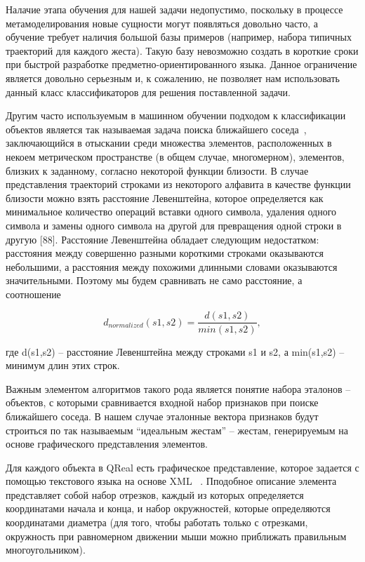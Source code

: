 \documentclass[a5paper]{article}
\begin{document}
Налачие этапа обучения для нашей задачи недопустимо, поскольку в процессе метамоделирования новые сущности могут появляться
довольно часто, а обучение требует наличия большой базы примеров (например, набора типичных траекторий для каждого жеста). Такую
базу невозможно создать в короткие сроки при быстрой разработке предметно-ориентированного языка. 
Данное ограничение является довольно серьезным и, к сожалению, не позволяет нам использовать данный класс классификаторов для решения 
поставленной задачи.

Другим часто используемым в машинном обучении подходом к классификации объектов является так называемая задача поиска ближайшего 
соседа~\cite{nns1, nns2}, заключающийся в отыскании среди множества элементов, расположенных в некоем метрическом пространстве (в 
общем случае, многомерном), элементов, близких к заданному, согласно некоторой функции близости. 
В случае представления траекторий строками из некоторого алфавита в качестве функции близости можно взять расстояние Левенштейна, 
которое определяется как минимальное количество операций вставки одного символа, удаления одного символа и замены 
одного символа на другой для превращения одной строки в другую [88]. Расстояние Левенштейна обладает следующим недостатком:
расстояния между совершенно разными короткими строками оказываются небольшими, а расстояния между похожими длинными словами 
оказываются значительными. Поэтому мы будем сравнивать не само расстояние, а соотношение 

\begin{equation}
\label{levenshtein}
d_{normalized}(s1,s2) = \frac{d(s1,s2)}{min(s1,s2)},
\end{equation}

где d(s1,s2) -- расстояние Левенштейна между строками s1 и s2, а min(s1,s2) -- минимум длин этих строк.

Важным элементом алгоритмов такого рода является понятие набора эталонов -- объектов, с которыми сравнивается входной набор признаков при 
поиске ближайшего соседа. В нашем случае эталонные вектора признаков будут строиться по так называемым ``идеальным жестам'' -- жестам,
генерируемым на основе графического представления элементов. 

Для каждого объекта в QReal есть графическое представление, которое задается с помощью текстового языка на основе XML ~\cite{qrealBasic}. 
Пподобное описание элемента представляет собой набор отрезков, каждый из которых определяется координатами начала и конца, и
набор окружностей, которые определяются координатами диаметра (для того, чтобы работать только с отрезками, окружность при 
равномерном движении мыши можно приближать правильным многоугольником). 
\end{document}
